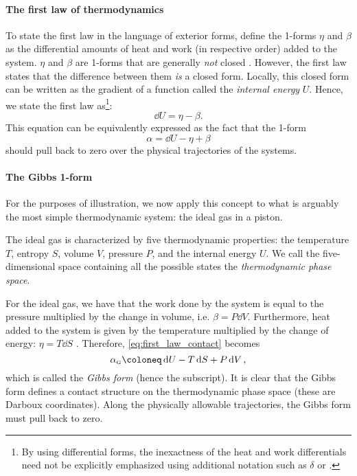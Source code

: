 \paragraph{The first law of thermodynamics} To state the first law in the language of exterior forms, define the 1-forms \(\eta\) and \(\beta\) as the differential amounts of heat and work (in respective order) added to the system. \(\eta\) and \(\beta\) are 1-forms that are generally \emph{not} closed \cite{Bamberg1988,Frankel2012}. However, the first law states that the difference between them \emph{is} a closed form. Locally, this closed form  can be written as the gradient of a function called the \emph{internal energy} \(U\). Hence, we state the first law as\footnote{By using differential forms, the inexactness of the heat and work differentials need not be explicitly emphasized using additional notation such as \(\delta\) or \dj.}:
\begin{equation}
    \dd{U} = \eta - \beta.
    \label{eq:thermo_first_law}
\end{equation}
This equation can be equivalently expressed as the fact that the 1-form
\begin{equation}
    \alpha = \dd{U} - \eta + \beta
    \label{eq:first_law_contact}
\end{equation}
should pull back to zero over the physical trajectories of the systems.

\paragraph{The Gibbs 1-form} For the purposes of illustration, we now apply this concept to what is arguably the most simple thermodynamic system: the ideal gas in a piston. 

The ideal gas is characterized by five thermodynamic properties: the temperature \(T\), entropy \(S\), volume \(V\), pressure \(P\), and the internal energy \(U\). We call the five-dimensional space containing all the possible states the \emph{thermodynamic phase space}.

For the ideal gas, we have that the work done by the system is equal to the pressure multiplied by the change in volume, i.e. \(\beta = P\dd{V}\). Furthermore, heat added to the system is given by the temperature multiplied by the change of energy: \(\eta = T\dd{S}\) \cite{Arnold1989b,Wightman1979,Bamberg1988}. Therefore, \cref{eq:first_law_contact} becomes
\begin{equation}
    \alpha_\text{\tiny G} \coloneq \dd{U} - T\dd{S} + P\dd{V},
    \label{eq:gibbs_form}
\end{equation}
which is called the \emph{Gibbs form} (hence the subscript). It is clear that the Gibbs form defines a contact structure on the thermodynamic phase space (these are Darboux coordinates). Along the physically allowable trajectories, the Gibbs form must pull back to zero.

